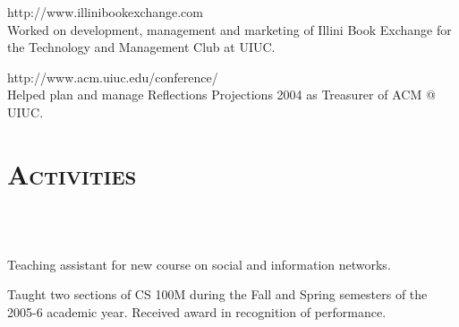 \begin{resume}
\begin{position}
http://www.illinibookexchange.com\\
Worked on development, management and marketing of Illini Book Exchange for the Technology and Management Club at UIUC. 
\end{position}

\begin{position}
http://www.acm.uiuc.edu/conference/\\
Helped plan and manage Reflections Projections 2004 as Treasurer of ACM @ UIUC.
\end{position}








\section{\textsc{Activities}}

\begin{formatb}
  \\
  \body\\
\end{formatb}

\begin{position}
Teaching assistant for new course on social and information networks.
\end{position}

\begin{position}
Taught two sections of CS 100M during the Fall and Spring semesters of the 2005-6 academic year.  Received award in recognition of performance.
\end{position}


\end{resume}
